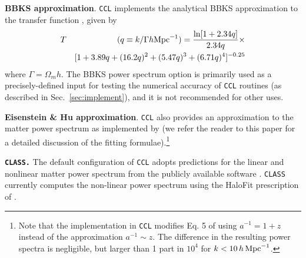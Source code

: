 \documentclass[\docopts]{\docclass}
\newcommand{\ccl}{{\tt CCL}\xspace}
\begin{document}
{\bf BBKS approximation}. \ccl implements the analytical BBKS approximation to the transfer function \citep{BBKS}, given by
\begin{eqnarray}
  \label{eq:bbks}
  T&&(q\equiv k/\Gamma h {\rm Mpc}^{-1}) = \frac{\ln[1+2.34q]}{2.34q}\times\\
  &&[1+3.89q+(16.2q)^2+(5.47q)^3+(6.71q)^4]^{-0.25}\nonumber
\end{eqnarray}
where $\Gamma = \Omega_m h$. The BBKS power spectrum option is primarily used as a precisely-defined input for testing the numerical accuracy of \ccl routines (as described in Sec.~\ref{sec:implement}),
and it is not recommended for other uses.

{\bf Eisenstein \& Hu approximation}. \ccl also provides an approximation to the matter power spectrum as implemented by \citet{1998ApJ...496..605E} (we refer the reader to this paper for a detailed discussion of the fitting formulae).\footnote{Note that the implementation in \ccl modifies Eq. 5 of \citet{1998ApJ...496..605E} using $a^{-1}=1+z$ instead of the approximation $a^{-1}\sim z$. The difference in the resulting power spectra is negligible, but larger than 1 part in $10^4$ for $k<10\,h\,{\rm Mpc}^{-1}$.}

{\bf \tt CLASS.} The default configuration of \ccl adopts predictions for the linear and nonlinear matter power spectrum from the publicly available software \citep{class}. {\tt CLASS} currently computes the non-linear power spectrum using the HaloFit prescription of \cite{CLASS_halofit}.
\end{document}
